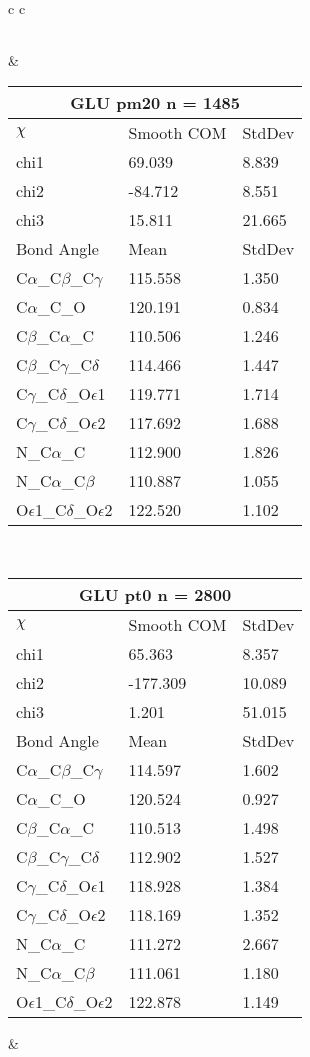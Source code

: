 \begin{longtable}{ c c }
\begin{tabular}{ l l l }
  \bottomrule
  \end{tabular}
  &
  \begin{tabular}{ l l l }
  \toprule
  \multicolumn{3}{c}{GLU \textbf{pm20} n = 1485} \\ \toprule
  $\chi$       & Smooth COM & StdDev \\ \midrule
  chi1 & 69.039 & 8.839 \\ 
  chi2 & -84.712 & 8.551 \\ 
  chi3 & 15.811 & 21.665 \\ \midrule
  Bond Angle   & Mean     & StdDev \\ \midrule
  C$\alpha$\_C$\beta$\_C$\gamma$ & 115.558 & 1.350\\
  C$\alpha$\_C\_O & 120.191 & 0.834\\
  C$\beta$\_C$\alpha$\_C & 110.506 & 1.246\\
  C$\beta$\_C$\gamma$\_C$\delta$ & 114.466 & 1.447\\
  C$\gamma$\_C$\delta$\_O$\epsilon$1 & 119.771 & 1.714\\
  C$\gamma$\_C$\delta$\_O$\epsilon$2 & 117.692 & 1.688\\
  N\_C$\alpha$\_C & 112.900 & 1.826\\
  N\_C$\alpha$\_C$\beta$ & 110.887 & 1.055\\
  O$\epsilon$1\_C$\delta$\_O$\epsilon$2 & 122.520 & 1.102\\
  \bottomrule
  \end{tabular}
  \\
  \begin{tabular}{ l l l }
  \toprule
  \multicolumn{3}{c}{GLU \textbf{pt0} n = 2800} \\ \toprule
  $\chi$       & Smooth COM & StdDev \\ \midrule
  chi1 & 65.363 & 8.357 \\ 
  chi2 & -177.309 & 10.089 \\ 
  chi3 & 1.201 & 51.015 \\ \midrule
  Bond Angle   & Mean     & StdDev \\ \midrule
  C$\alpha$\_C$\beta$\_C$\gamma$ & 114.597 & 1.602\\
  C$\alpha$\_C\_O & 120.524 & 0.927\\
  C$\beta$\_C$\alpha$\_C & 110.513 & 1.498\\
  C$\beta$\_C$\gamma$\_C$\delta$ & 112.902 & 1.527\\
  C$\gamma$\_C$\delta$\_O$\epsilon$1 & 118.928 & 1.384\\
  C$\gamma$\_C$\delta$\_O$\epsilon$2 & 118.169 & 1.352\\
  N\_C$\alpha$\_C & 111.272 & 2.667\\
  N\_C$\alpha$\_C$\beta$ & 111.061 & 1.180\\
  O$\epsilon$1\_C$\delta$\_O$\epsilon$2 & 122.878 & 1.149\\
  \bottomrule
  \end{tabular}
  &
  \\
  
\end{longtable}    


